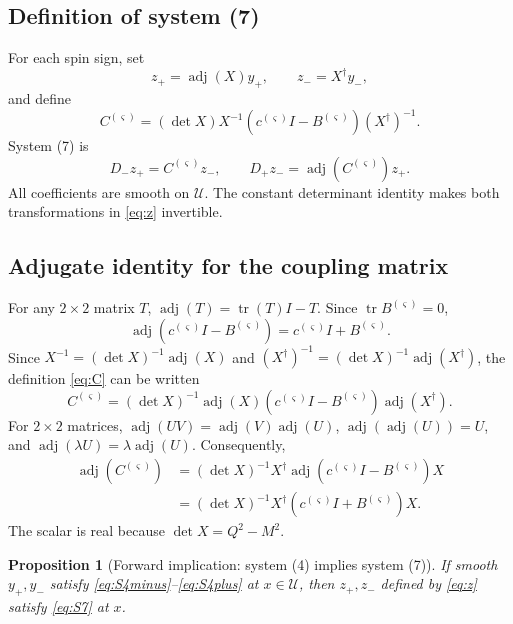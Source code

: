 \documentclass[11pt,a4paper]{article}
\numberwithin{equation}{section}
\newtheorem{proposition}[theorem]{Proposition}
\theoremstyle{definition}
\theoremstyle{remark}
\newcommand{\tr}{\operatorname{tr}}
\newcommand{\adj}{\operatorname{adj}}
\newcommand{\Uext}{\mathcal U}
\begin{document}
\subsection{Definition of system (7)}

For each spin sign, set
\begin{equation}
 z_+=\adj(X)y_+,\qquad z_-=X^\dagger y_-,
\label{eq:z}
\end{equation}
and define
\begin{equation}
 C^{(\varsigma)}
 =(\det X)X^{-1}
 \left(c^{(\varsigma)}I-B^{(\varsigma)}\right)
 (X^\dagger)^{-1}.
\label{eq:C}
\end{equation}
System (7) is
\begin{equation}
 D_-z_+=C^{(\varsigma)}z_-,\qquad
 D_+z_-=\adj(C^{(\varsigma)})z_+.
\label{eq:S7}
\end{equation}
All coefficients are smooth on \(\Uext\).  The constant determinant
identity makes both transformations in \eqref{eq:z} invertible.

\subsection{Adjugate identity for the coupling matrix}

For any \(2\times2\) matrix \(T\),
\(\adj(T)=\tr(T)I-T\).  Since \(\tr B^{(\varsigma)}=0\),
\begin{equation}
 \adj(c^{(\varsigma)}I-B^{(\varsigma)})
 =c^{(\varsigma)}I+B^{(\varsigma)}.
\label{eq:adjcB}
\end{equation}
Since \(X^{-1}=(\det X)^{-1}\adj(X)\) and
\((X^\dagger)^{-1}=(\det X)^{-1}\adj(X^\dagger)\), the definition
\eqref{eq:C} can be written
\[
 C^{(\varsigma)}
 =(\det X)^{-1}\adj(X)
 (c^{(\varsigma)}I-B^{(\varsigma)})\adj(X^\dagger).
\]
For \(2\times2\) matrices, \(\adj(UV)=\adj(V)\adj(U)\),
\(\adj(\adj(U))=U\), and \(\adj(\lambda U)=\lambda\adj(U)\).
Consequently,
\begin{align}
 \adj(C^{(\varsigma)})
 &=(\det X)^{-1}X^\dagger
 \adj(c^{(\varsigma)}I-B^{(\varsigma)})X\nonumber\\
 &=(\det X)^{-1}X^\dagger
 \left(c^{(\varsigma)}I+B^{(\varsigma)}\right)X.
\label{eq:adjC}
\end{align}
The scalar is real because \(\det X=Q^2-M^2\).

\begin{proposition}[Forward implication: system (4) implies system (7)]
\label{prop:forward}
If smooth \(y_+,y_-\) satisfy \eqref{eq:S4minus}--\eqref{eq:S4plus}
at \(x\in\Uext\), then \(z_+,z_-\) defined by \eqref{eq:z} satisfy
\eqref{eq:S7} at \(x\).
\end{proposition}
\end{document}
